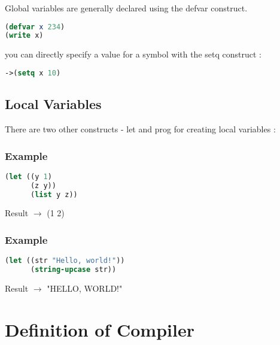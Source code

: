 \documentclass[12pt]{article}
\begin{document}
Global variables are generally declared using the defvar construct.

\lstset{style=mystyle}
\begin{lstlisting}[language=Lisp, caption=Lisp example]
(defvar x 234)
(write x)
\end{lstlisting}


you can directly specify a value for a symbol with the setq construct :



\lstset{style=mystyle}
\begin{lstlisting}[language=Lisp, caption=Lisp example]
->(setq x 10)
\end{lstlisting}



\subsection{Local Variables}


There are two other constructs - let and prog for creating local variables :


\subsubsection{Example}


\lstset{style=mystyle}
\begin{lstlisting}[language=Lisp, caption=Lisp example]
(let ((y 1)
      (z y))
      (list y z))
\end{lstlisting}

Result  $\to$ (1 2)\newline

             
\subsubsection{Example}


\lstset{style=mystyle}
\begin{lstlisting}[language=Lisp, caption=Lisp example]
(let ((str "Hello, world!"))
      (string-upcase str))
\end{lstlisting}

Result $\to$ "HELLO, WORLD!"

\newpage


\section{Definition of Compiler}
\end{document}

